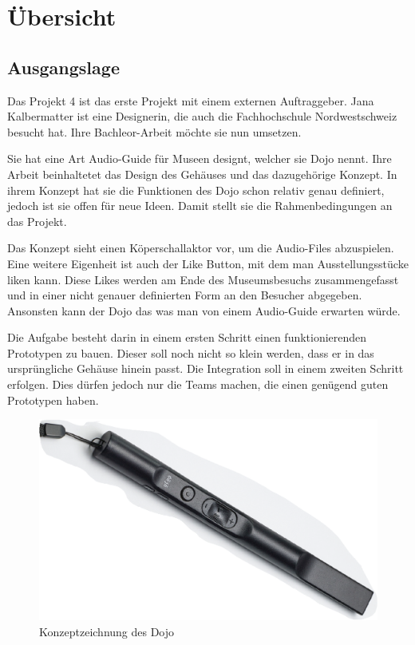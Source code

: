 \section{Übersicht} 

\subsection{Ausgangslage}
Das Projekt 4 ist das erste Projekt mit einem externen Auftraggeber. Jana Kalbermatter ist eine Designerin, die auch die Fachhochschule Nordwestschweiz besucht hat. Ihre Bachleor-Arbeit möchte sie nun umsetzen.

Sie hat eine Art Audio-Guide für Museen designt, welcher sie Dojo nennt. Ihre Arbeit beinhaltetet das Design des Gehäuses und das dazugehörige Konzept. In ihrem Konzept hat sie die Funktionen des Dojo schon relativ genau definiert, jedoch ist sie offen für neue Ideen. Damit stellt sie die Rahmenbedingungen an das Projekt.

Das Konzept sieht einen Köperschallaktor vor, um die Audio-Files abzuspielen. Eine weitere Eigenheit ist auch der Like Button, mit dem man Ausstellungsstücke \glqq liken \grqq kann. Diese Likes werden am Ende des Museumsbesuchs zusammengefasst und in einer nicht genauer definierten Form an den Besucher abgegeben. Ansonsten kann der Dojo das was man von einem Audio-Guide erwarten würde.

Die Aufgabe besteht darin in einem ersten Schritt einen funktionierenden Prototypen zu bauen. Dieser soll noch nicht so klein werden, dass er in das ursprüngliche Gehäuse hinein passt. Die Integration soll in einem zweiten Schritt erfolgen. Dies dürfen jedoch nur die Teams machen, die einen genügend guten Prototypen haben.

\begin{figure}[H]
\begin{center}
	\includegraphics[width=160mm]{data/Ausgangslage_Dojo.png}
	\caption{Konzeptzeichnung des Dojo} %
	\label{fig:ausgangslage}
\end{center}
\end{figure}

